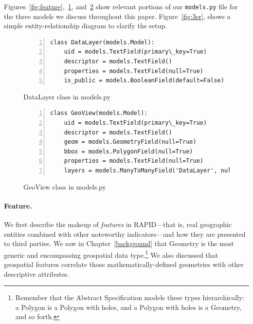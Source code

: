 Figures~\ref{fig:feature},~\ref{fig:datalayer}, and~\ref{fig:geoview} show relevant portions of our \texttt{models.py} file for the three models we discuss throughout this paper. Figure~\ref{fig:3er}, shows a simple entity-relationship diagram to clarify the setup. 

\begin{figure}[ht]
\vspace{15pt}
\begin{Verbatim}[samepage=true,baselinestretch=1,numbers=left,xleftmargin=12mm]
class DataLayer(models.Model):
    uid = models.TextField(primary\_key=True)
    descriptor = models.TextField()
    properties = models.TextField(null=True)
    is_public = models.BooleanField(default=False)
\end{Verbatim}
\vspace{-18pt}
\caption{DataLayer class in models.py}
\label{fig:datalayer}
\end{figure}

\begin{figure}[ht]
\begin{Verbatim}[samepage=true,baselinestretch=1,numbers=left,xleftmargin=12mm]
class GeoView(models.Model):
    uid = models.TextField(primary\_key=True)
    descriptor = models.TextField()
    geom = models.GeometryField(null=True)
    bbox = models.PolygonField(null=True)
    properties = models.TextField(null=True)
    layers = models.ManyToManyField('DataLayer', null=True)
\end{Verbatim}
\vspace{-18pt}
\caption{GeoView class in models.py}
\label{fig:geoview}
\end{figure}

\paragraph{Feature.}
We first describe the makeup of \textit{features} in RAPID---that is, real geographic entities combined with other noteworthy indicators---and how they are presented to third parties. We saw in Chapter~\ref{background} that Geometry is the most generic and encompassing geospatial data type.\footnote{Remember that the Abstract Specification models these types hierarchically: a Polygon is a Polygon with holes, and a Polygon with holes is a Geometry, and so forth.} We also discussed that geospatial features correlate those mathematically-defined geometries with other descriptive attributes.

